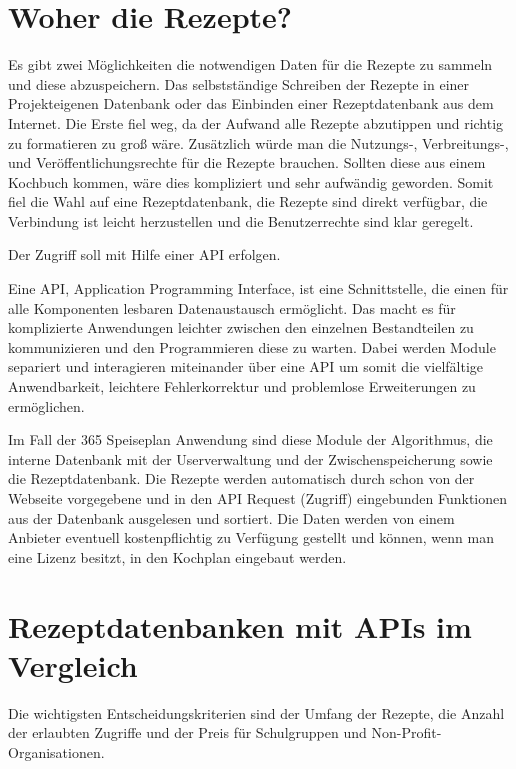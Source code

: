 \section{Woher die Rezepte?}
Es gibt zwei Möglichkeiten die notwendigen Daten für die Rezepte zu sammeln und diese abzuspeichern. Das selbstständige Schreiben der Rezepte in einer Projekteigenen Datenbank oder das Einbinden einer Rezeptdatenbank aus dem Internet. Die Erste fiel weg, da der Aufwand alle Rezepte abzutippen und richtig zu formatieren zu groß wäre. Zusätzlich würde man die Nutzungs-, Verbreitungs-, und Veröffentlichungsrechte für die Rezepte brauchen. Sollten diese aus einem Kochbuch kommen, wäre dies kompliziert und sehr aufwändig geworden.
Somit fiel die Wahl auf eine Rezeptdatenbank, die Rezepte sind direkt verfügbar, die Verbindung ist leicht herzustellen und die Benutzerrechte sind klar geregelt.

Der Zugriff soll mit Hilfe einer API\cite{apidef} erfolgen.

Eine API, Application Programming Interface, ist eine Schnittstelle, die einen für alle Komponenten lesbaren Datenaustausch ermöglicht. Das macht es für komplizierte Anwendungen leichter zwischen den einzelnen Bestandteilen zu kommunizieren und den Programmieren diese zu warten. Dabei werden Module separiert und interagieren miteinander über eine API um somit die vielfältige Anwendbarkeit, leichtere Fehlerkorrektur und problemlose Erweiterungen zu ermöglichen.

Im Fall der 365 Speiseplan Anwendung sind diese Module der Algorithmus, die interne Datenbank mit der Userverwaltung und der Zwischenspeicherung sowie die Rezeptdatenbank. Die Rezepte werden automatisch durch schon von der Webseite vorgegebene und in den API Request (Zugriff) eingebunden Funktionen aus der Datenbank ausgelesen und sortiert. Die Daten werden von einem Anbieter eventuell kostenpflichtig zu Verfügung gestellt und können, wenn man eine Lizenz besitzt, in den Kochplan eingebaut werden.

\section{Rezeptdatenbanken mit APIs im Vergleich}

Die wichtigsten Entscheidungskriterien sind der Umfang der Rezepte, die Anzahl der erlaubten Zugriffe und der Preis für Schulgruppen und Non-Profit-Organisationen.



